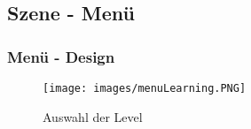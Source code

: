 \subsection{Szene - Menü}

\subsubsection{Menü - Design}

\begin{figure}[htbp]
  \centering
  \texttt{[image: images/menuLearning.PNG]}
  \caption{Auswahl der Level}
  \label{MenüLernen01}
\end{figure}


